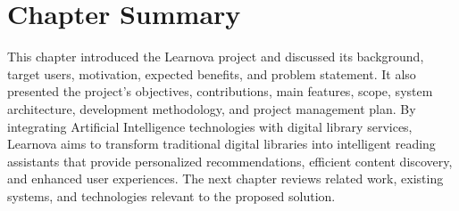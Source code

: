\section*{Chapter Summary}

This chapter introduced the Learnova project and discussed its background,
target users, motivation, expected benefits, and problem statement. It also
presented the project's objectives, contributions, main features, scope,
system architecture, development methodology, and project management plan.
By integrating Artificial Intelligence technologies with digital library
services, Learnova aims to transform traditional digital libraries into
intelligent reading assistants that provide personalized recommendations,
efficient content discovery, and enhanced user experiences. The next chapter
reviews related work, existing systems, and technologies relevant to the
proposed solution.